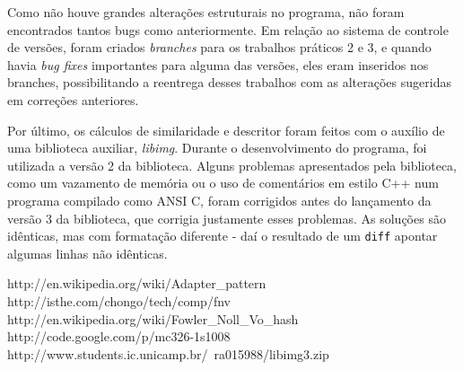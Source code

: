 \documentclass[a4paper,10pt]{article}
\begin{document}
Como não houve grandes alterações estruturais no programa, não foram encontrados tantos bugs como anteriormente. Em relação ao sistema de controle de versões, foram criados \textit{branches} para os trabalhos práticos 2 e 3, e quando havia \textit{bug fixes} importantes para alguma das versões, eles eram inseridos nos branches, possibilitando a reentrega desses trabalhos com as alterações sugeridas em correções anteriores.

Por último, os cálculos de similaridade e descritor foram feitos com o auxílio de uma biblioteca auxiliar, \textit{libimg}\cite{libimg}. Durante o desenvolvimento do programa, foi utilizada a versão 2 da biblioteca. Alguns problemas apresentados pela biblioteca, como um vazamento de memória ou o uso de comentários em estilo C++ num programa compilado como ANSI C, foram corrigidos antes do lançamento da versão 3 da biblioteca, que corrigia justamente esses problemas. As soluções são idênticas, mas com formatação diferente - daí o resultado de um \texttt{diff} apontar algumas linhas não idênticas.

\begin{thebibliography}{99}
 http://en.wikipedia.org/wiki/Adapter\_pattern
 http://isthe.com/chongo/tech/comp/fnv
 http://en.wikipedia.org/wiki/Fowler\_Noll\_Vo\_hash
 http://code.google.com/p/mc326-1s1008
 http://www.students.ic.unicamp.br/~ra015988/libimg3.zip
\end{thebibliography}
\end{document}
